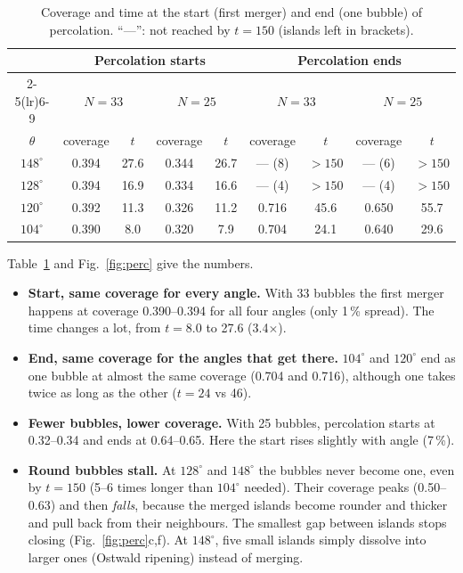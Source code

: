 \documentclass[11pt,a4paper]{article}
\begin{document}
\begin{table}[b]
\centering
\caption{Coverage and time at the start (first merger) and end (one bubble) of
percolation. ``---'': not reached by $t=150$ (islands left in brackets).}
\label{tab:perc}
\small
\setlength{\tabcolsep}{5pt}
\begin{tabular}{c cc cc cc cc}
\toprule
 & \multicolumn{4}{c}{Percolation starts} & \multicolumn{4}{c}{Percolation ends}\\
\cmidrule(lr){2-5}\cmidrule(lr){6-9}
 & \multicolumn{2}{c}{$N=33$} & \multicolumn{2}{c}{$N=25$} & \multicolumn{2}{c}{$N=33$} & \multicolumn{2}{c}{$N=25$}\\
$\theta$ & coverage & $t$ & coverage & $t$ & coverage & $t$ & coverage & $t$\\
\midrule
$148^\circ$ & 0.394 & 27.6 & 0.344 & 26.7 & --- (8) & $>150$ & --- (6) & $>150$\\
$128^\circ$ & 0.394 & 16.9 & 0.334 & 16.6 & --- (4) & $>150$ & --- (4) & $>150$\\
$120^\circ$ & 0.392 & 11.3 & 0.326 & 11.2 & 0.716 & 45.6 & 0.650 & 55.7\\
$104^\circ$ & 0.390 &  8.0 & 0.320 &  7.9 & 0.704 & 24.1 & 0.640 & 29.6\\
\bottomrule
\end{tabular}
\end{table}

Table~\ref{tab:perc} and Fig.~\ref{fig:perc} give the numbers.
\begin{itemize}
  \item \textbf{Start, same coverage for every angle.} With 33 bubbles the first
        merger happens at coverage 0.390--0.394 for all four angles (only 1\,\%
        spread). The time changes a lot, from $t=8.0$ to 27.6 (3.4$\times$).
  \item \textbf{End, same coverage for the angles that get there.} $104^\circ$ and
        $120^\circ$ end as one bubble at almost the same coverage (0.704 and
        0.716), although one takes twice as long as the other ($t=24$ vs 46).
  \item \textbf{Fewer bubbles, lower coverage.} With 25 bubbles, percolation
        starts at 0.32--0.34 and ends at 0.64--0.65. Here the start rises
        slightly with angle (7\,\%).
  \item \textbf{Round bubbles stall.} At $128^\circ$ and $148^\circ$ the bubbles
        never become one, even by $t=150$ (5--6 times longer than $104^\circ$
        needed). Their coverage peaks (0.50--0.63) and then \emph{falls}, because
        the merged islands become rounder and thicker and pull back from their
        neighbours. The smallest gap between islands stops closing
        (Fig.~\ref{fig:perc}c,f). At $148^\circ$, five small islands simply
        dissolve into larger ones (Ostwald ripening) instead of merging.
\end{itemize}
\end{document}
